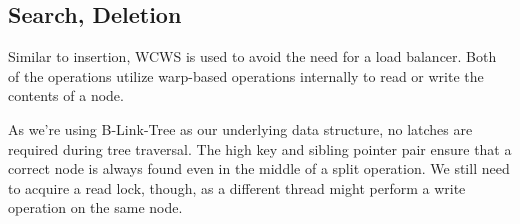 \subsection{Search, Deletion}

Similar to insertion, WCWS is used to avoid the need for a load balancer. Both of the operations utilize warp-based operations internally to read or write the contents of a node.

As we're using B-Link-Tree as our underlying data structure, no latches are required during tree traversal. The high key and sibling pointer pair ensure that a correct node is always found even in the middle of a split operation. We still need to acquire a read lock, though, as a different thread might perform a write operation on the same node.